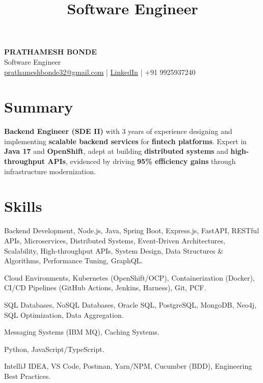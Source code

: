 \documentclass[10pt,a4paper,sans]{moderncv}
\title{Software Engineer}
\begin{document}
\begin{center}
    {\Huge \bfseries \color{primary} PRATHAMESH BONDE} \\
    \vspace{2pt}
    {\large Software Engineer} \\
    \vspace{3pt}
    \small
    \href{mailto:prathameshbonde32@gmail.com}{prathameshbonde32@gmail.com} \quad | \quad 
    \href{https://linkedin.com/in/prathameshbonde}{LinkedIn} \quad | \quad 
    +91 9925937240
\end{center}

\section{Summary}
\textbf{Backend Engineer (SDE II)} with 3 years of experience designing and implementing \textbf{scalable backend services} for \textbf{fintech platforms}. Expert in \textbf{Java 17} and \textbf{OpenShift}, adept at building \textbf{distributed systems} and \textbf{high-throughput APIs}, evidenced by driving \textbf{95\% efficiency gains} through infrastructure modernization.

\section{Skills}
\begin{description}[leftmargin=0pt, itemsep=-2pt, parsep=1pt, topsep=0pt]
    \item[\textbf{Backend Engineering \& System Design:}] Backend Development, Node.js, Java, Spring Boot, Express.js, FastAPI, RESTful APIs, Microservices, Distributed Systems, Event-Driven Architectures, Scalability, High-throughput APIs, System Design, Data Structures \& Algorithms, Performance Tuning, GraphQL.
    \item[\textbf{Cloud \& DevOps:}] Cloud Environments, Kubernetes (OpenShift/OCP), Containerization (Docker), CI/CD Pipelines (GitHub Actions, Jenkins, Harness), Git, PCF.
    \item[\textbf{Databases \& Data:}] SQL Databases, NoSQL Databases, Oracle SQL, PostgreSQL, MongoDB, Neo4j, SQL Optimization, Data Aggregation.
    \item[\textbf{Messaging \& Caching:}] Messaging Systems (IBM MQ), Caching Systems.
    \item[\textbf{Languages \& Frameworks:}] Python, JavaScript/TypeScript.
    \item[\textbf{Tools \& Methodologies:}] IntelliJ IDEA, VS Code, Postman, Yarn/NPM, Cucumber (BDD), Engineering Best Practices.
\end{description}
\end{document}
